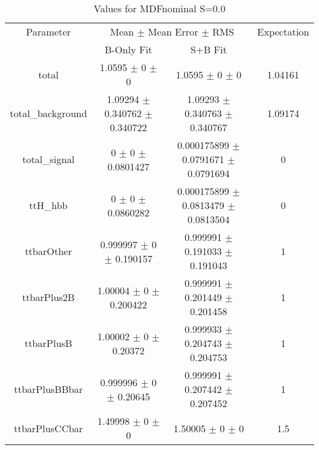 \begin{table}
\centering
\caption{Values for MDFnominal S=0.0}
\begin{tabular}{cccc}
\toprule
Parameter & \multicolumn{2}{c}{Mean $\pm$ Mean Error $\pm$ RMS} & Expectation\\
 & B-Only Fit & S+B Fit & \\
\midrule
total & \num{1.0595} $\pm$ \num{0} $\pm$ \num{0} & \num{1.0595} $\pm$ \num{0} $\pm$ \num{0} & \num{1.04161}\\
total\_background & \num{1.09294} $\pm$ \num{0.340762} $\pm$ \num{0.340722} & \num{1.09293} $\pm$ \num{0.340763} $\pm$ \num{0.340767} & \num{1.09174}\\
total\_signal & \num{0} $\pm$ \num{0} $\pm$ \num{0.0801427} & \num{0.000175899} $\pm$ \num{0.0791671} $\pm$ \num{0.0791694} & \num{0}\\
ttH\_hbb & \num{0} $\pm$ \num{0} $\pm$ \num{0.0860282} & \num{0.000175899} $\pm$ \num{0.0813479} $\pm$ \num{0.0813504} & \num{0}\\
ttbarOther & \num{0.999997} $\pm$ \num{0} $\pm$ \num{0.190157} & \num{0.999991} $\pm$ \num{0.191033} $\pm$ \num{0.191043} & \num{1}\\
ttbarPlus2B & \num{1.00004} $\pm$ \num{0} $\pm$ \num{0.200422} & \num{0.999991} $\pm$ \num{0.201449} $\pm$ \num{0.201458} & \num{1}\\
ttbarPlusB & \num{1.00002} $\pm$ \num{0} $\pm$ \num{0.20372} & \num{0.999933} $\pm$ \num{0.204743} $\pm$ \num{0.204753} & \num{1}\\
ttbarPlusBBbar & \num{0.999996} $\pm$ \num{0} $\pm$ \num{0.20645} & \num{0.999991} $\pm$ \num{0.207442} $\pm$ \num{0.207452} & \num{1}\\
ttbarPlusCCbar & \num{1.49998} $\pm$ \num{0} $\pm$ \num{0} & \num{1.50005} $\pm$ \num{0} $\pm$ \num{0} & \num{1.5}\\
\bottomrule
\end{tabular}
\end{table}